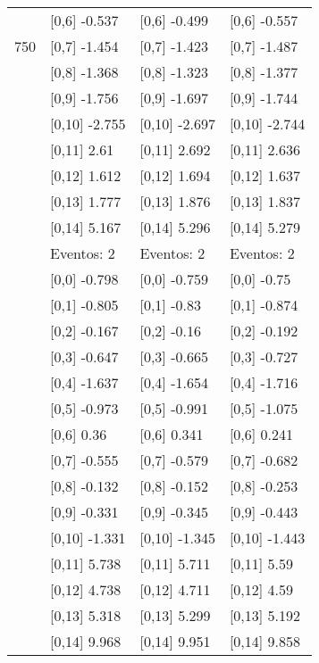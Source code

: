 \begin{table}
\begin{tabular}[t]{llll}
 & {}[0,6] -0.537 & {}[0,6] -0.499 & {}[0,6] -0.557\\
750 & {}[0,7] -1.454 & {}[0,7] -1.423 & {}[0,7] -1.487\\
\addlinespace
 & {}[0,8] -1.368 & {}[0,8] -1.323 & {}[0,8] -1.377\\
 & {}[0,9] -1.756 & {}[0,9] -1.697 & {}[0,9] -1.744\\
 & {}[0,10] -2.755 & {}[0,10] -2.697 & {}[0,10] -2.744\\
 & {}[0,11] 2.61 & {}[0,11] 2.692 & {}[0,11] 2.636\\
 & {}[0,12] 1.612 & {}[0,12] 1.694 & {}[0,12] 1.637\\
\addlinespace
 & {}[0,13] 1.777 & {}[0,13] 1.876 & {}[0,13] 1.837\\
 & {}[0,14] 5.167 & {}[0,14] 5.296 & {}[0,14] 5.279\\
 & Eventos:  2 & Eventos:  2 & Eventos:  2\\
 & {}[0,0] -0.798 & {}[0,0] -0.759 & {}[0,0] -0.75\\
 & {}[0,1] -0.805 & {}[0,1] -0.83 & {}[0,1] -0.874\\
\addlinespace
 & {}[0,2] -0.167 & {}[0,2] -0.16 & {}[0,2] -0.192\\
 & {}[0,3] -0.647 & {}[0,3] -0.665 & {}[0,3] -0.727\\
 & {}[0,4] -1.637 & {}[0,4] -1.654 & {}[0,4] -1.716\\
 & {}[0,5] -0.973 & {}[0,5] -0.991 & {}[0,5] -1.075\\
 & {}[0,6] 0.36 & {}[0,6] 0.341 & {}[0,6] 0.241\\
\addlinespace
1000 & {}[0,7] -0.555 & {}[0,7] -0.579 & {}[0,7] -0.682\\
 & {}[0,8] -0.132 & {}[0,8] -0.152 & {}[0,8] -0.253\\
 & {}[0,9] -0.331 & {}[0,9] -0.345 & {}[0,9] -0.443\\
 & {}[0,10] -1.331 & {}[0,10] -1.345 & {}[0,10] -1.443\\
 & {}[0,11] 5.738 & {}[0,11] 5.711 & {}[0,11] 5.59\\
\addlinespace
 & {}[0,12] 4.738 & {}[0,12] 4.711 & {}[0,12] 4.59\\
 & {}[0,13] 5.318 & {}[0,13] 5.299 & {}[0,13] 5.192\\
 & {}[0,14] 9.968 & {}[0,14] 9.951 & {}[0,14] 9.858\\
\bottomrule
\end{tabular}
\end{table}
